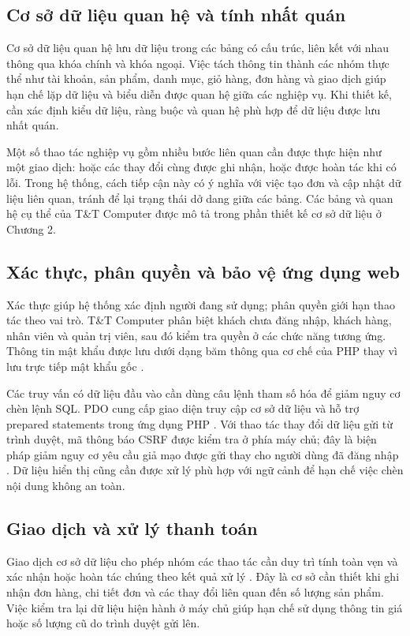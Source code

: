 \subsection{Cơ sở dữ liệu quan hệ và tính nhất quán}
Cơ sở dữ liệu quan hệ lưu dữ liệu trong các bảng có cấu trúc, liên kết với nhau thông qua khóa chính và khóa ngoại. Việc tách thông tin thành các nhóm thực thể như tài khoản, sản phẩm, danh mục, giỏ hàng, đơn hàng và giao dịch giúp hạn chế lặp dữ liệu và biểu diễn được quan hệ giữa các nghiệp vụ. Khi thiết kế, cần xác định kiểu dữ liệu, ràng buộc và quan hệ phù hợp để dữ liệu được lưu nhất quán.

Một số thao tác nghiệp vụ gồm nhiều bước liên quan cần được thực hiện như một giao dịch: hoặc các thay đổi cùng được ghi nhận, hoặc được hoàn tác khi có lỗi. Trong hệ thống, cách tiếp cận này có ý nghĩa với việc tạo đơn và cập nhật dữ liệu liên quan, tránh để lại trạng thái dở dang giữa các bảng. Các bảng và quan hệ cụ thể của T\&T Computer được mô tả trong phần thiết kế cơ sở dữ liệu ở Chương 2.

\subsection{Xác thực, phân quyền và bảo vệ ứng dụng web}
Xác thực giúp hệ thống xác định người đang sử dụng; phân quyền giới hạn thao tác theo vai trò. T\&T Computer phân biệt khách chưa đăng nhập, khách hàng, nhân viên và quản trị viên, sau đó kiểm tra quyền ở các chức năng tương ứng. Thông tin mật khẩu được lưu dưới dạng băm thông qua cơ chế của PHP thay vì lưu trực tiếp mật khẩu gốc \cite{php-password-hash}.

Các truy vấn có dữ liệu đầu vào cần dùng câu lệnh tham số hóa để giảm nguy cơ chèn lệnh SQL. PDO cung cấp giao diện truy cập cơ sở dữ liệu và hỗ trợ prepared statements trong ứng dụng PHP \cite{php-pdo}. Với thao tác thay đổi dữ liệu gửi từ trình duyệt, mã thông báo CSRF được kiểm tra ở phía máy chủ; đây là biện pháp giảm nguy cơ yêu cầu giả mạo được gửi thay cho người dùng đã đăng nhập \cite{owasp-csrf}. Dữ liệu hiển thị cũng cần được xử lý phù hợp với ngữ cảnh để hạn chế việc chèn nội dung không an toàn.

\subsection{Giao dịch và xử lý thanh toán}
Giao dịch cơ sở dữ liệu cho phép nhóm các thao tác cần duy trì tính toàn vẹn và xác nhận hoặc hoàn tác chúng theo kết quả xử lý \cite{mysql-transactions}. Đây là cơ sở cần thiết khi ghi nhận đơn hàng, chi tiết đơn và các thay đổi liên quan đến số lượng sản phẩm. Việc kiểm tra lại dữ liệu hiện hành ở máy chủ giúp hạn chế sử dụng thông tin giá hoặc số lượng cũ do trình duyệt gửi lên.


